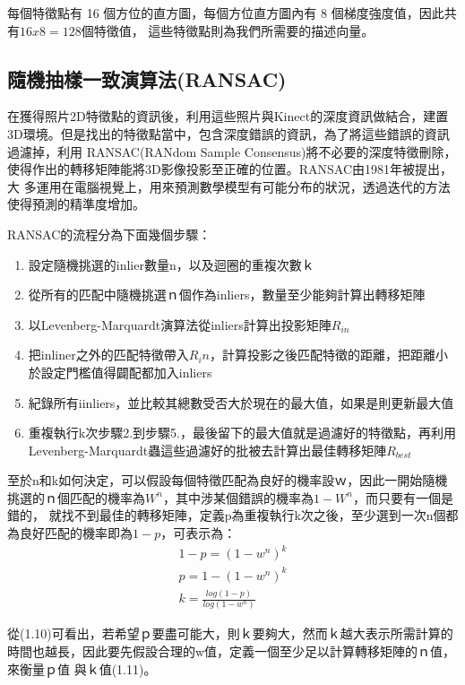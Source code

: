      每個特徵點有 16 個方位的直方圖，每個方位直方圖內有 8 個梯度強度值，因此共有$ 16 x 8 = 128$個特徵值，
     這些特徵點則為我們所需要的描述向量。

\subsection{隨機抽樣一致演算法(RANSAC)}

	在獲得照片2D特徵點的資訊後，利用這些照片與Kinect的深度資訊做結合，建置3D環境。但是找出的特徵點當中，包含深度錯誤的資訊，為了將這些錯誤的資訊過濾掉，利用
RANSAC(RANdom Sample Consensus)將不必要的深度特徵刪除，使得作出的轉移矩陣能將3D影像投影至正確的位置。RANSAC\cite{Fischler1981}由1981年被提出，大
多運用在電腦視覺上，用來預測數學模型有可能分布的狀況，透過迭代的方法使得預測的精準度增加。

	RANSAC的流程分為下面幾個步驟：
　\begin{enumerate}
	  \item 設定隨機挑選的inlier數量n，以及迴圈的重複次數ｋ
	  \item 從所有的匹配中隨機挑選ｎ個作為inliers，數量至少能夠計算出轉移矩陣
	  \item 以Levenberg-Marquardt演算法從inliers計算出投影矩陣$R_{in}$
	  \item 把inliner之外的匹配特徵帶入$R_in$，計算投影之後匹配特徵的距離，把距離小於設定門檻值得闢配都加入inliers
	  \item 紀錄所有iinliers，並比較其總數受否大於現在的最大值，如果是則更新最大值
	  \item 重複執行k次步驟2.到步驟5.，最後留下的最大值就是過濾好的特徵點，再利用Levenberg-Marquardt蟲這些過濾好的批被去計算出最佳轉移矩陣$R_{best}$
 \end{enumerate}

	至於n和k如何決定，可以假設每個特徵匹配為良好的機率設ｗ，因此一開始隨機挑選的ｎ個匹配的機率為$W^n$，其中涉某個錯誤的機率為$1-W^n$，而只要有一個是錯的，
就找不到最佳的轉移矩陣，定義p為重複執行k次之後，至少選到一次n個都為良好匹配的機率即為$1-p$，可表示為：
\begin{align}
	1-p = (1-w^n)^k   \\
	p = 1 - (1-w^n)^k \\
	k = \frac{log(1-p)}{log(1-w^n)} 
\end{align}

    從(1.10)可看出，若希望ｐ要盡可能大，則ｋ要夠大，然而ｋ越大表示所需計算的時間也越長，因此要先假設合理的w值，定義一個至少足以計算轉移矩陣的ｎ值，來衡量ｐ值
與ｋ值(1.11)。
